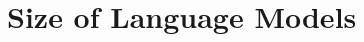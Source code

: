 \documentclass{beamer}
\begin{document}







\section{Size of Language Models}




























\end{document}
